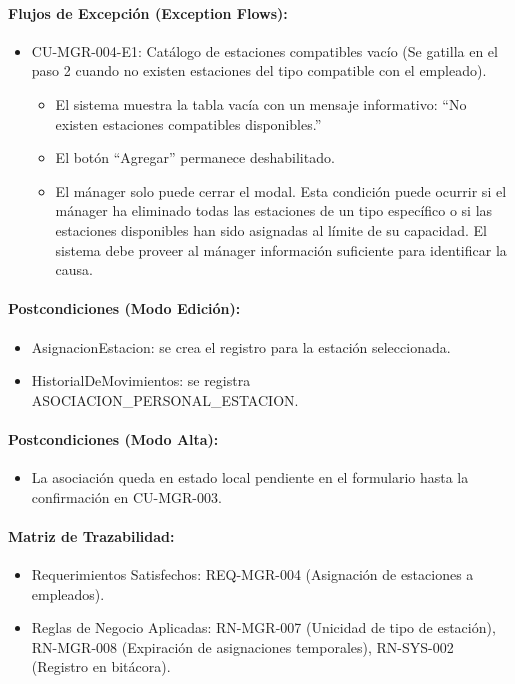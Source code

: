 \paragraph{Flujos de Excepción (Exception Flows):}
\begin{itemize}
    \item CU-MGR-004-E1: Catálogo de estaciones compatibles vacío (Se gatilla en el paso 2 cuando no existen estaciones del tipo compatible con el empleado).
    \begin{itemize}
        \item El sistema muestra la tabla vacía con un mensaje informativo: ``No existen estaciones compatibles disponibles.''
        \item El botón ``Agregar'' permanece deshabilitado.
        \item El mánager solo puede cerrar el modal. Esta condición puede ocurrir si el mánager ha eliminado todas las estaciones de un tipo específico o si las estaciones disponibles han sido asignadas al límite de su capacidad. El sistema debe proveer al mánager información suficiente para identificar la causa.
    \end{itemize}
\end{itemize}

\paragraph{Postcondiciones (Modo Edición):}
\begin{itemize}
    \item AsignacionEstacion: se crea el registro para la estación seleccionada.
    \item HistorialDeMovimientos: se registra ASOCIACION\_PERSONAL\_ESTACION.
\end{itemize}

\paragraph{Postcondiciones (Modo Alta):}
\begin{itemize}
    \item La asociación queda en estado local pendiente en el formulario hasta la confirmación en CU-MGR-003.
\end{itemize}

\paragraph{Matriz de Trazabilidad:}
\begin{itemize}
    \item Requerimientos Satisfechos: REQ-MGR-004 (Asignación de estaciones a empleados).
    \item Reglas de Negocio Aplicadas: RN-MGR-007 (Unicidad de tipo de estación), RN-MGR-008 (Expiración de asignaciones temporales), RN-SYS-002 (Registro en bitácora).
\end{itemize}

